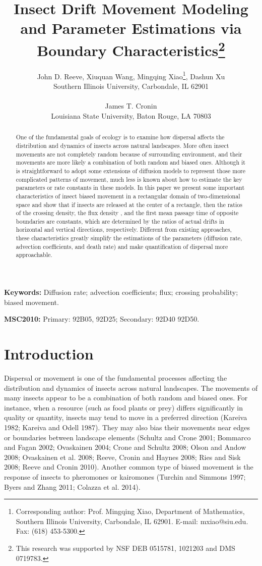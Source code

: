 \documentclass[11pt]{article}
\title{Insect Drift Movement Modeling and Parameter Estimations via Boundary Characteristics\thanks{This research was supported by NSF DEB  0515781, 1021203 and DMS 0719783.}}
\author{John D. Reeve, Xiuquan Wang, Mingqing Xiao\thanks{Corresponding author: Prof. Mingqing Xiao, Department of Mathematics, Southern Illinois University, Carbondale, IL 62901. E-mail: mxiao@siu.edu. Fax: (618) 453-5300.}, Dashun Xu\\
Southern Illinois University, Carbondale, IL 62901\\ \\
James T. Cronin\\
Louisiana State University,
Baton Rouge, LA 70803}
\begin{document}
\maketitle

\begin{abstract}
One of the fundamental goals of ecology is to examine how dispersal affects the distribution and dynamics of insects across natural landscapes. More often insect movements are not completely random because of surrounding environment, and  their movements are more likely  a combination of both random and biased ones. Although it is straightforward to adopt some extensions of diffusion models to represent those more complicated patterns of movement, much less is known about how to estimate the key parameters or rate constants in these models. In this paper we present some important characteristics of insect biased movement in a rectangular domain of two-dimensional space and show that if insects are released at the center of a rectangle, then the ratios of the crossing density, the flux density , and the first mean passage time of opposite boundaries are constants, which are determined by the ratios of actual drifts in horizontal and vertical directions, respectively. Different from existing approaches, these characteristics greatly simplify the estimations of the parameters (diffusion rate, advection coefficients, and death rate) and make quantification of dispersal more approachable.
\end{abstract}

{\bf Keywords:} Diffusion rate; advection coefficients; flux; crossing probability;  biased movement.

{\bf MSC2010:} Primary: 92B05, 92D25; Secondary: 92D40 92D50.

\medskip





\section{Introduction}

Dispersal or movement is one of the fundamental processes affecting the distribution and dynamics of insects across natural landscapes.  The movements of many insects appear to be a combination of both random and biased ones.  For instance, when a resource (such as food plants or prey) differs significantly in quality or quantity, insects may tend to move in a preferred direction (Kareiva 1982; Kareiva and Odell 1987).  They may also bias their movements near edges or boundaries between landscape elements (Schultz and Crone 2001; Bommarco and Fagan 2002; Ovaskainen 2004; Crone and Schultz 2008; Olson and Andow 2008; Ovaskainen et al. 2008; Reeve, Cronin and Haynes 2008; Ries and Sisk 2008; Reeve and Cronin 2010).  Another common type of biased movement is the response of insects to pheromones or kairomones (Turchin and Simmons 1997; Byers and Zhang 2011; Colazza et al. 2014).  
\end{document}
